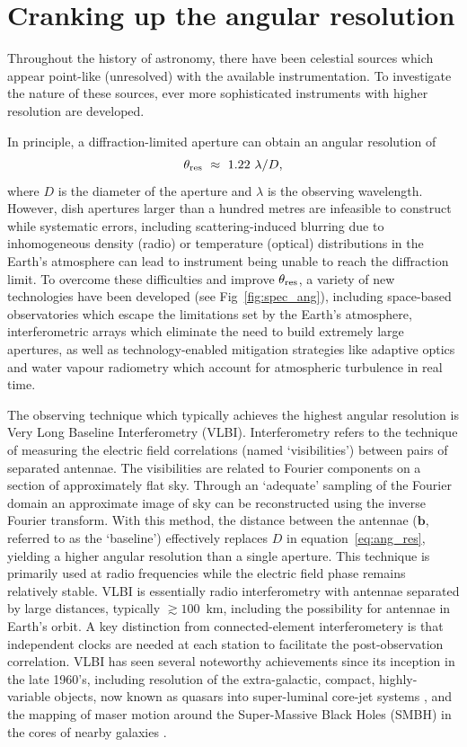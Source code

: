 {\section{Cranking up the angular resolution}
Throughout the history of astronomy, there have been celestial sources which appear point-like (unresolved) with the available instrumentation. To investigate the nature of these sources, ever more sophisticated instruments with higher resolution are developed. 

In principle, a diffraction-limited aperture can obtain an angular resolution of
\begin{equation}\label{eq:ang_res}
 \theta_{\rm res}\ \approx \ 1.22\ \lambda / D,
\end{equation}
where $D$ is the diameter of the aperture and $\lambda$ is the observing wavelength. However, dish apertures larger than a hundred metres are infeasible to construct while systematic errors, including scattering-induced blurring due to inhomogeneous density (radio) or temperature (optical) distributions in the Earth's atmosphere can lead to instrument being unable to reach the diffraction limit. To overcome these difficulties and improve $\theta_{\rm res}$, a variety of new technologies have been developed (see Fig~\ref{fig:spec_ang}), including space-based observatories which escape the limitations set by the Earth's atmosphere, interferometric arrays which eliminate the need to build extremely large apertures, as well as technology-enabled mitigation strategies like adaptive optics and water vapour radiometry which account for atmospheric turbulence in real time. 


The observing technique which typically achieves the highest angular resolution is Very Long Baseline Interferometry (VLBI). Interferometry refers to the technique of measuring the electric field correlations (named `visibilities') between pairs of separated antennae. The visibilities are related to Fourier components on a section of approximately flat sky. Through an `adequate' sampling of the Fourier domain an approximate image of sky can be reconstructed using the inverse Fourier transform. With this method, the distance between the antennae ($\bm{b}$, referred to as the `baseline') effectively replaces $D$ in equation~\ref{eq:ang_res}, yielding a higher angular resolution than a single aperture. This technique is primarily used at radio frequencies while the electric field phase remains relatively stable. VLBI is essentially radio interferometry with antennae separated by large distances, typically $\gtrsim 100$~km, including the possibility for antennae in Earth's orbit. A key distinction from connected-element interferometery is that independent clocks are needed at each station to facilitate the post-observation correlation. VLBI has seen several noteworthy achievements since its inception in the late 1960's, including resolution of the extra-galactic, compact, highly-variable objects, now known as quasars into super-luminal core-jet systems \citep[e.g.][]{Whitney_1971}, and the mapping of maser motion around the Super-Massive Black Holes (SMBH) in the cores of nearby galaxies \citep[e.g.][]{Miyoshi_1995}.


}
